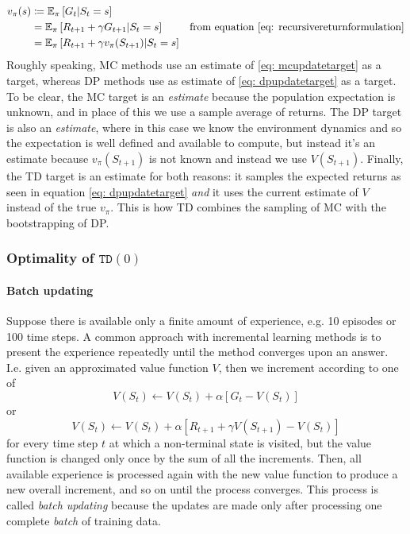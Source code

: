 \documentclass[12pt]{article}
\begin{document}
\begin{align}
  \label{eq: mcupdatetarget}
  v_\pi(s) &\coloneqq \mathbb E_\pi \left[G_t | S_t = s \right] \\
           &= \mathbb E_\pi \left[R_{t+1} + \gamma G_{t+1} | S_t = s \right]                       &\textrm{from equation \ref{eq: recursivereturnformulation}} \\
  \label{eq: dpupdatetarget}
           &= \mathbb E_\pi \left[ R_{t+1} + \gamma v_\pi(S_{t+1}) | S_t = s \right]
\end{align}
Roughly speaking, MC methods use an estimate of \ref{eq: mcupdatetarget} as a target, whereas DP methods use as estimate of \ref{eq: dpupdatetarget} as a target. To be clear, the MC target is an \emph{estimate} because the population expectation is unknown, and in place of this we use a sample average of returns. The DP target is also an \emph{estimate}, where in this case we know the environment dynamics and so the expectation is well defined and available to compute, but instead it's an estimate because $v_\pi(S_{t+1})$ is not known and instead we use $V(S_{t+1})$. Finally, the TD target is an estimate for both reasons: it samples the expected returns as seen in equation \ref{eq: dpupdatetarget} \emph{and} it uses the current estimate of $V$ instead of the true $v_\pi$. This is how TD combines the sampling of MC with the bootstrapping of DP.

\begin{figure}[h]
  \centering
  \begin{tikzpicture}
  \end{tikzpicture}
\end{figure}
\subsubsection{Optimality of $\texttt{TD}(0)$}
\paragraph{Batch updating} Suppose there is available only a finite amount of experience, e.g. 10 episodes or 100 time steps. A common approach with incremental learning methods is to present the experience repeatedly until the method converges upon an answer. I.e. given an approximated value function $V$, then we increment according to one of
\[
V(S_t) \gets V(S_t) + \alpha \left[G_t - V(S_t)\right]
\]
or
\[
V(S_t) \gets V(S_t) + \alpha \left[R_{t+1} + \gamma V(S_{t+1}) - V(S_t)\right]
\]
for every time step $t$ at which a non-terminal state is visited, but the value function is changed only once by the sum of all the increments. Then, all available experience is processed again with the new value function to produce a new overall increment, and so on until the process converges. This process is called \emph{batch updating} because the updates are made only after processing one complete \emph{batch} of training data.
\end{document}
